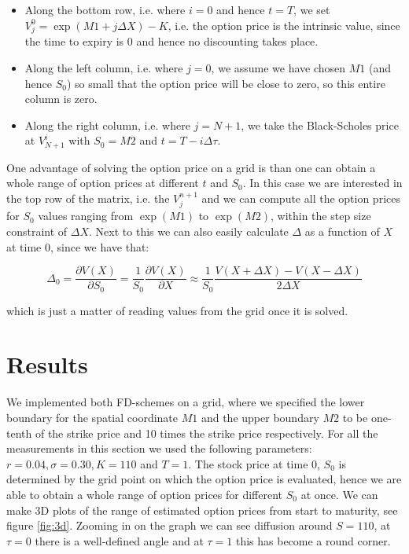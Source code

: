 \documentclass[11pt,a4paper]{article}
\begin{document}
\begin{itemize}
\item 
  Along the bottom row, i.e. where $i = 0$ and hence $t = T$, we set $V^0_j = \exp{(M1 + j\Delta X)} - K$, i.e. the option price is the intrinsic value, since the time to expiry is 0 and hence no discounting takes place.
\item
  Along the left column, i.e. where $j = 0$, we assume we have chosen $M1$ (and hence $S_0$) so small that the option price will be close to zero, so this entire column is zero.
\item
  Along the right column, i.e. where $j = N+1$, we take the Black-Scholes price at $V^i_{N+1}$ with $S_0 = M2$ and $t = T - i\Delta \tau$.
\end{itemize}

One advantage of solving the option price on a grid is than one can obtain a whole range of option prices at different $t$ and $S_0$. In this case we are interested in the top row of the matrix, i.e. the $V^{n+1}_j$ and we can compute all the option prices for $S_0$ values ranging from $\exp{(M1)}$ to $\exp{(M2)}$, within the step size constraint of $\Delta X$. Next to this we can also easily calculate $\Delta$ as a function of $X$ at time 0, since we have that:

\begin{equation}
  \Delta_0 = \frac{\partial V(X)}{\partial S_0} = \frac{1}{S_0}\frac{\partial V(X)}{\partial X} \approx \frac{1}{S_0} \frac{V(X + \Delta X) - V(X - \Delta X)}{2\Delta X}
\label{eq:Delta}
\end{equation}

which is just a matter of reading values from the grid once it is solved.

\newpage
\section{Results}

We implemented both FD-schemes on a grid, where we specified the lower boundary for the spatial coordinate $M1$ and the upper boundary $M2$ to be one-tenth of the strike price and 10 times the strike price respectively. For all the measurements in this section we used the following parameters: $r = 0.04, \sigma = 0.30, K = 110$ and $T = 1$. The stock price at time 0, $S_0$ is determined by the grid point on which the option price is evaluated, hence we are able to obtain a whole range of option prices for different $S_0$ at once. We can make 3D plots of the range of estimated option prices from start to maturity, see figure \ref{fig:3d}. Zooming in on the graph we can see diffusion around $S=110$, at $\tau = 0$ there is a well-defined angle and at $\tau = 1$ this has become a round corner. 
\end{document}
